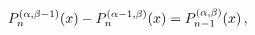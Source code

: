 \[\mathop{P^{(\alpha,\beta-1)}_{n}\/}\nolimits\!\left(x\right)-\mathop{P^{(%
\alpha-1,\beta)}_{n}\/}\nolimits\!\left(x\right)=\mathop{P^{(\alpha,\beta)}_{n%
-1}\/}\nolimits\!\left(x\right),\]